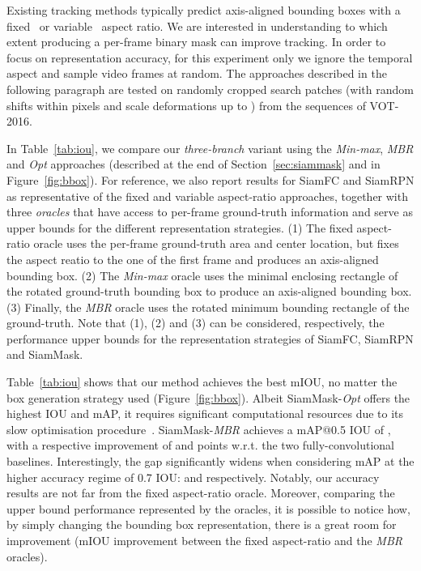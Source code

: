 \documentclass[10pt,twocolumn,letterpaper]{article}
\newcommand{\mypar}[1]{\smallskip\noindent {\bf #1}\enskip}
\begin{document}
\mypar{How much does the object representation matter?}
Existing tracking methods typically predict axis-aligned bounding boxes with a fixed~\cite{bertinetto2016fully,henriques2015tracking,danelljan2015learning,lukezic2017discriminative} or variable~\cite{SiamRPN,held2016learning,zhu2018distractor} aspect ratio.
We are interested in understanding to which extent producing a per-frame binary mask can improve tracking.
In order to focus on representation accuracy, for this experiment only we ignore the temporal aspect and sample video frames at random.
The approaches described in the following paragraph are tested on randomly cropped search patches (with random shifts within  pixels and scale deformations up to ) from the sequences of VOT-2016.


In Table~\ref{tab:iou}, we compare our \emph{three-branch} variant using the \emph{Min-max}, \emph{MBR} and \emph{Opt} approaches (described at the end of Section~\ref{sec:siammask} and in Figure~\ref{fig:bbox}).
For reference, we also report results for SiamFC and SiamRPN as representative of the fixed and variable aspect-ratio approaches, together with three \emph{oracles} that have access to per-frame ground-truth information and serve as upper bounds for the different representation strategies.
(1) The fixed aspect-ratio oracle uses the per-frame ground-truth area and center location, but fixes the aspect reatio to the one of the first frame and produces an axis-aligned bounding box.
(2) The \emph{Min-max} oracle uses the minimal enclosing rectangle of the rotated ground-truth bounding box to produce an axis-aligned bounding box.
(3) Finally, the \textit{MBR} oracle uses the rotated minimum bounding rectangle of the ground-truth.
Note that (1), (2) and (3) can be considered, respectively, the performance upper bounds for the representation strategies of SiamFC, SiamRPN and SiamMask.

Table~\ref{tab:iou} shows that our method achieves the best mIOU, no matter the box generation strategy used (Figure~\ref{fig:bbox}).
Albeit SiamMask-\textit{Opt} offers the highest IOU and mAP, it requires significant computational resources due to its slow optimisation procedure~\cite{vojir2017pixel}. 
SiamMask-\textit{MBR} achieves a mAP@0.5 IOU  of , with a respective improvement of  and  points w.r.t. the two fully-convolutional baselines.
Interestingly, the gap significantly widens when considering mAP at the higher accuracy regime of 0.7 IOU:  and  respectively.
Notably, our accuracy results are not far from the fixed aspect-ratio oracle.
Moreover, comparing the upper bound performance represented by the oracles, it is possible to notice how, by simply changing the bounding box representation, there is a great room for improvement (\eg  mIOU improvement between the fixed aspect-ratio and the \textit{MBR} oracles).
\end{document}
